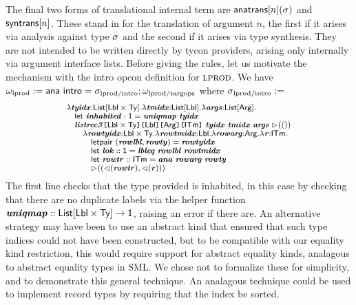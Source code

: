 \documentclass[10pt,preprint]{sigplanconf}
\begin{document}
The final two forms of translational internal term are ${\sf anatrans}[n](\sigma)$ and ${\sf syntrans}[n]$. These stand in for the translation of argument $n$, the first if it arises via analysis against type $\sigma$ and the second if it arises via type synthesis. They are not intended to be written directly by tycon providers, arising only internally via argument interface lists. Before giving the rules, let us motivate the mechanism with the intro opcon definition for $\textsc{lprod}$. We have $\omega_\text{lprod} := {\sf ana}~{\sf intro}=\sigma_\text{lprod/intro}; \omega_\text{lprod/targops}$ where $\sigma_\text{lprod/intro} :=$
\[\small
\begin{array}{l}
\lambda\svar{tyidx}{:}\klist{\klbl\times\kty}.\lambda\svar{tmidx}{:}\klist{\klbl}.\lambda\svar{args}{:}\kargs.\\
\quad \keyw{let}~\svar{inhabited}:\kunit=\svar{uniqmap}~\svar{tyidx}\\
\quad \skap{\kitm}{\skap{\karg}{\skap{\klbl}{\skap{\klbl\times\kty}{\svar{listrec3}}}}}~\svar{tyidx}~\svar{tmidx}~\svar{args}~\sqitm{\itriv}\\
\quad\quad \lambda \svar{rowtyidx}{:}\klbl\times\kty.\lambda \svar{rowtmidx}{:}\klbl.\lambda\svar{rowarg}{:}\karg.\lambda \svar{r}{:}\kitm.\\
\quad\quad\quad \keyw{letpair}~(\svar{rowlbl}, \svar{rowty})=\svar{rowtyidx}\\
\quad\quad\quad \keyw{let}~\svar{lok}::\kunit=\svar{lbleq}~\svar{rowlbl} ~\svar{rowtmidx}\\
\quad\quad\quad \keyw{let}~\svar{rowtr} :: \kitm = \svar{ana}~\svar{rowarg}~\svar{rowty}\\
\quad\quad\quad \sqitm{(\quq{\svar{rowtr}}, \quq{\svar{r}})
}
\end{array}
\]
The first line checks that the type provided is inhabited, in this case by checking that there are no duplicate labels via the helper function ${\textbf{\textit{uniqmap}}} :: {\sf List}[{\sf Lbl} \times {\sf Ty}]\rightarrow {\sf 1}$, raising an error if there are. An alternative strategy may have been to use an abstract kind that ensured that such type indices could not have been constructed, but to be compatible with our equality kind restriction, this would require support for abstract equality kinds, analagous to abstract equality types in SML. We chose not to formalize these for simplicity, and to demonstrate this general technique. An analagous technique could be used to implement record types by requiring that the index be sorted.%
\end{document}
